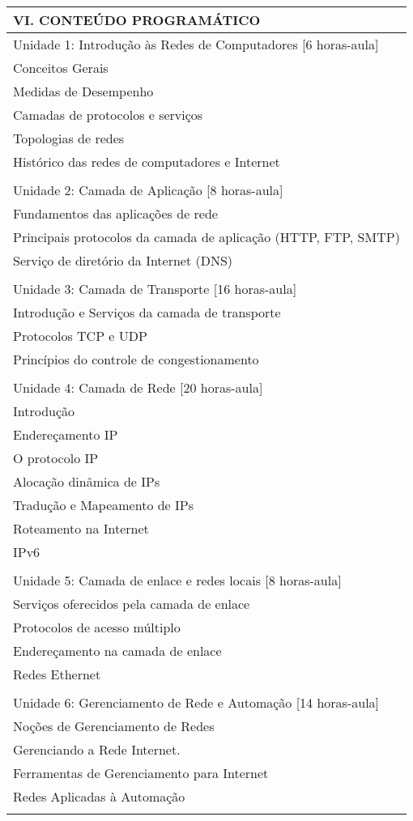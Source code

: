 \documentclass[12pt]{article}
\begin{document}
\begin{longtable}{|L{1.025\textwidth}|} \hline
%
{\bf VI. CONTEÚDO PROGRAMÁTICO } \\ \hline
Unidade 1: Introdução às Redes de Computadores [6 horas-aula]\\
Conceitos Gerais	\\
Medidas de Desempenho\\
Camadas de protocolos e serviços\\
Topologias de redes\\
Histórico das redes de computadores e Internet\\
\\
Unidade 2: Camada de Aplicação [8 horas-aula]\\
Fundamentos das aplicações de rede\\
Principais protocolos da camada de aplicação (HTTP, FTP, SMTP)\\
Serviço de diretório da Internet (DNS)\\
\\
Unidade 3: Camada de Transporte [16 horas-aula]\\
Introdução e Serviços da camada de transporte\\
Protocolos TCP e UDP\\
Princípios do controle de congestionamento\\
\\
Unidade 4: Camada de Rede [20 horas-aula]\\
Introdução\\
Endereçamento IP\\
O protocolo IP\\
Alocação dinâmica de IPs\\
Tradução e Mapeamento de IPs\\
Roteamento na Internet\\
IPv6\\
\\
Unidade 5: Camada de enlace e redes locais [8 horas-aula]\\
Serviços oferecidos pela camada de enlace\\
Protocolos de acesso múltiplo\\
Endereçamento na camada de enlace\\
Redes Ethernet\\
\\
Unidade 6: Gerenciamento de Rede e Automação [14 horas-aula] \\
Noções de Gerenciamento de Redes\\
Gerenciando a Rede Internet.\\
Ferramentas de Gerenciamento para Internet \\
Redes Aplicadas à Automação \\
\\ \hline
\end{longtable} 
\end{document}
